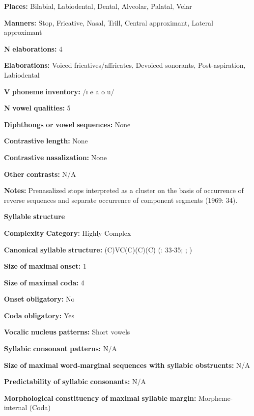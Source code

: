 \textbf{Places:} Bilabial, Labiodental, Dental, Alveolar, Palatal, Velar

\textbf{Manners:} Stop, Fricative, Nasal, Trill, Central approximant, Lateral approximant

\textbf{N} \textbf{elaborations:} 4

\textbf{Elaborations:} Voiced fricatives/affricates, Devoiced sonorants, Post-aspiration, Labiodental

\textbf{V} \textbf{phoneme} \textbf{inventory:} /ɪ e a o u/

\textbf{N} \textbf{vowel} \textbf{qualities:} 5

\textbf{Diphthongs} \textbf{or} \textbf{vowel} \textbf{sequences:} None

\textbf{Contrastive} \textbf{length:} None

\textbf{Contrastive} \textbf{nasalization:} None

\textbf{Other} \textbf{contrasts:} N/A

\textbf{Notes:} Prenasalized stops interpreted as a cluster on the basis of occurrence of reverse sequences and separate occurrence of component segments (1969: 34).

\textbf{Syllable} \textbf{structure}

\textbf{Complexity} \textbf{Category:} Highly Complex

\textbf{Canonical} \textbf{syllable} \textbf{structure:} (C)VC(C)(C)(C) (\citealt{Summer1969}: 33-35; \citealt{Sommer1981}; \citealt{Dixon1970})

\textbf{Size} \textbf{of} \textbf{maximal} \textbf{onset:} 1

\textbf{Size} \textbf{of} \textbf{maximal} \textbf{coda:} 4

\textbf{Onset} \textbf{obligatory:} No

\textbf{Coda} \textbf{obligatory:} Yes

\textbf{Vocalic} \textbf{nucleus} \textbf{patterns:} Short vowels

\textbf{Syllabic} \textbf{consonant} \textbf{patterns:} N/A

\textbf{Size} \textbf{of} \textbf{maximal} \textbf{word{}-marginal sequences with syllabic obstruents:} N/A

\textbf{Predictability} \textbf{of} \textbf{syllabic} \textbf{consonants:} N/A

\textbf{Morphological} \textbf{constituency} \textbf{of} \textbf{maximal} \textbf{syllable} \textbf{margin:} Morpheme-internal (Coda)

